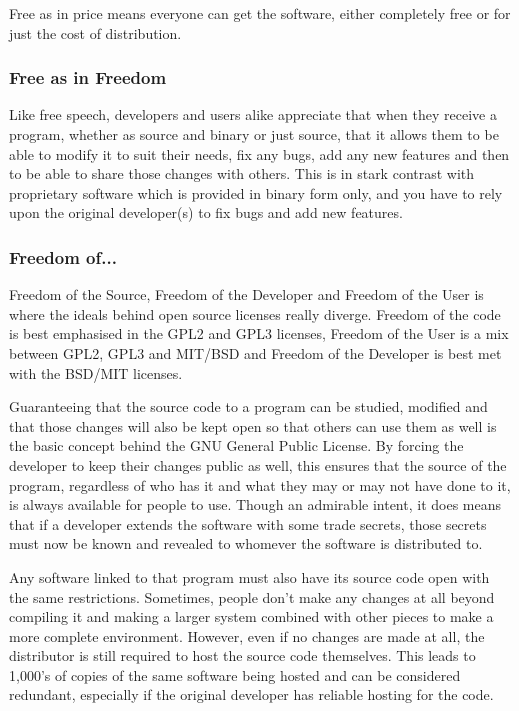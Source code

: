 Free as in price means everyone can get the software, either completely free or for just the cost of distribution.

\subsubsection{Free as in Freedom}
Like free speech, developers and users alike appreciate that when they receive a program, whether as source and binary or just source, that it allows them to be able to modify it to suit their needs, fix any bugs, add any new features and then to be able to share those changes with others. This is in stark contrast with proprietary software which is provided in binary form only, and you have to rely upon the original developer(s) to fix bugs and add new features.

\subsubsection{Freedom of...}
Freedom of the Source, Freedom of the Developer and Freedom of the User is where the ideals behind open source licenses really diverge. Freedom of the code is best emphasised in the GPL2 and GPL3 licenses, Freedom of the User is a mix between GPL2, GPL3 and MIT/BSD and Freedom of the Developer is best met with the BSD/MIT licenses.

Guaranteeing that the source code to a program can be studied, modified and that those changes will also be kept open so that others can use them as well is the basic concept behind the GNU General Public License. By forcing the developer to keep their changes public as well, this ensures that the source of the program, regardless of who has it and what they may or may not have done to it, is always available for people to use. Though an admirable intent, it does means that if a developer extends the software with some trade secrets, those secrets must now be known and revealed to whomever the software is distributed to.

Any software linked to that program must also have its source code open with the same restrictions. Sometimes, people don't make any changes at all beyond compiling it and making a larger system combined with other pieces to make a more complete environment. However, even if no changes are made at all, the distributor is still required to host the source code themselves. This leads to 1,000's of copies of the same software being hosted and can be considered redundant, especially if the original developer has reliable hosting for the code.

